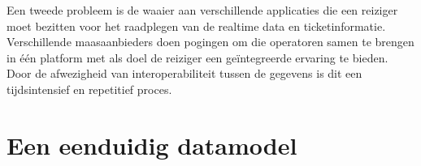 Een tweede probleem is de waaier aan verschillende applicaties die een reiziger moet bezitten voor het raadplegen van de realtime data en ticketinformatie. Verschillende \glspl{maasaanbieder} doen pogingen om die operatoren samen te brengen in één platform met als doel de reiziger een geïntegreerde ervaring te bieden. Door de afwezigheid van interoperabiliteit tussen de gegevens is dit een tijdsintensief en repetitief proces.

\begin{comment}
\Glspl{mobop} bieden vandaag elk hun eigen platform aan om reizigers toegang te bieden tot hun service. Dit resulteert in een waaier aan verschillende applicaties voor het raadplegen van de beschikbaarheid en uurroosters van steps, fietsen, auto’s, bussen en treinen. Voor iedere mobiliteitsactiviteit dient de reiziger ook een gepast ticket of abonnement op zak te hebben, wat niet vanzelfsprekend is wanneer er maar sporadisch gebruik wordt gemaakt van de dienst. Verschillende \glspl{maasaanbieder} en routeplanners doen pogingen om die operatoren samen te brengen in één platform met als doel de reiziger een geïntegreerde ervaring te bieden.
\end{comment}

\begin{comment}
Er moet worden onderzocht welke gegevens steden of gemeenten, waar de operator actief is, vereisen. De RDF ontologie moet op deze noden voorbereid zijn zodat de mapping volledig kan gebeuren en iedere service naadloos in eender welk platform kan worden geïmplementeerd.

Een eerste aandachtspunt is dat er rekening moet worden gehouden met de locatie waar welke operator actief is en waar niet. Wanneer er een bepaalde operator geen overeenkomst heeft met een stad/gemeente en daar de service niet aangeboden wordt, mag de dienst niet zichtbaar zijn in de user interface. Ten tweede moeten er voorspellingen kunnen worden gedaan over wanneer er een vervoermiddel beschikbaar zal zijn in een specifieke parkeerplaats wanneer reserveren niet mogelijk is. Zo kan een reiziger weten of er een vervoermiddel ter beschikking zal zijn op het moment dat hij één nodig heeft.
\end{comment}

\chapter{Een eenduidig datamodel}
\label{chap:eenduidig_datamodel}

